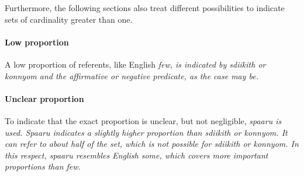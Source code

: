 
Furthermore, the following sections also treat different possibilities to indicate sets of cardinality greater than one.

\paragraph{Low proportion}\label{sec:func:Lowproportion}
A low proportion of referents, like English \em few, \em is indicated by \em sdiikith \em or \em konnyom \em and the affirmative or negative predicate, as the case may be.






\paragraph{Unclear proportion}\label{sec:func:Unclearproportion}
To indicate that the exact proportion is unclear, but not negligible, \em spaaru \em is used.
\em Spaaru \em indicates a slightly higher proportion than \em sdiikith \em or \em konnyom\em. It can refer to about half of the set, which is not possible for \em sdiikith \em or \em konnyom\em. In this respect, \em spaaru \em resembles English \em some\em, which covers more important proportions than \em few\em.

